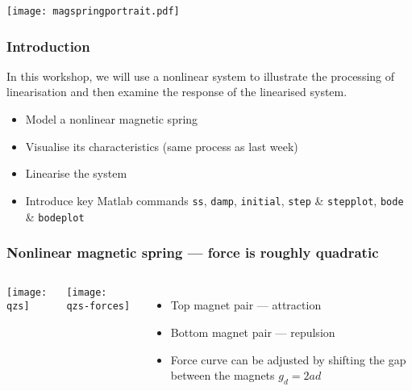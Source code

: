 \documentclass[9pt]{beamer-control}
\begin{document}

\begin{frame}
\centerline{\texttt{[image: magspringportrait.pdf]}}
\end{frame}

\begin{frame}
\frametitle{Introduction}
In this workshop, we will use a nonlinear system to illustrate the processing of linearisation and then examine the response of the linearised system.
\begin{itemize}
\item Model a nonlinear magnetic spring
\item Visualise its characteristics (same process as last week)
\item Linearise the system
\item Introduce key Matlab commands \texttt{ss}, \texttt{damp}, \texttt{initial}, \texttt{step} \& \texttt{stepplot}, \texttt{bode} \& \texttt{bodeplot}
\end{itemize}

\end{frame}


\begin{frame}[fragile]
\frametitle{Nonlinear magnetic spring --- force is roughly quadratic}

\begin{columns}

\texttt{[image: qzs]}


\texttt{[image: qzs-forces]}%
\begin{itemize}
\item Top magnet pair --- attraction
\item Bottom magnet pair --- repulsion
\item Force curve can be adjusted by shifting the gap between the magnets $g_d = 2ad$
\end{itemize}

\end{columns}

\end{frame}
\end{document}
